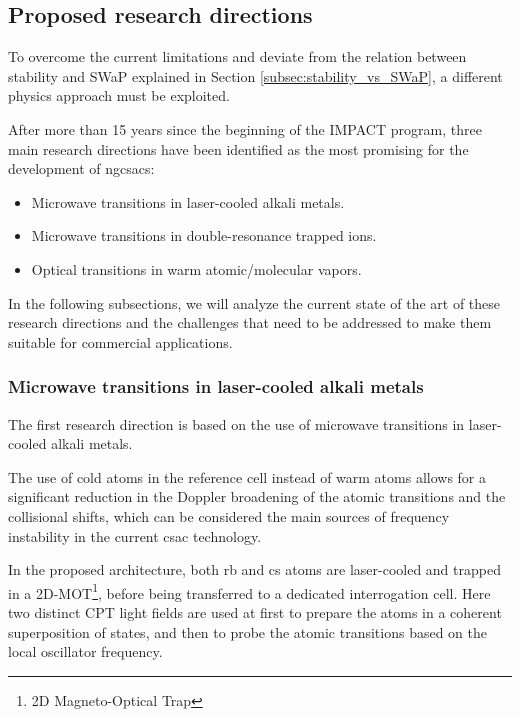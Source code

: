 \subsection{Proposed research directions}
\label{subsec:proposed_research_directions}

To overcome the current limitations and deviate from the relation between stability and SWaP explained in Section \ref{subsec:stability_vs_SWaP}, a different physics approach must be exploited.

After more than 15 years since the beginning of the IMPACT program, three main research directions have been identified as the most promising for the development of \acrshort{ngcsacs}:

\begin{itemize}
    \item Microwave transitions in laser-cooled alkali metals.
    \item Microwave transitions in double-resonance trapped ions.
    \item Optical transitions in warm atomic/molecular vapors.
\end{itemize}

In the following subsections, we will analyze the current state of the art of these research directions and the challenges that need to be addressed to make them suitable for commercial applications.


\subsubsection{Microwave transitions in laser-cooled alkali metals}
\label{subsubsec:laser_cooled_alkali}

The first research direction is based on the use of microwave transitions in laser-cooled alkali metals.

The use of cold atoms in the reference cell instead of warm atoms allows for a significant reduction in the Doppler broadening of the atomic transitions and the collisional shifts, which can be considered the main sources of frequency instability in the current \acrshort{csac} technology.

In the proposed architecture, both \acrshort{rb} and \acrshort{cs} atoms are laser-cooled and trapped in a 2D-MOT\footnote{2D Magneto-Optical Trap}, before being transferred to a dedicated interrogation cell.
Here two distinct CPT light fields are used at first to prepare the atoms in a coherent superposition of states, and then to probe the atomic transitions based on the local oscillator frequency.

